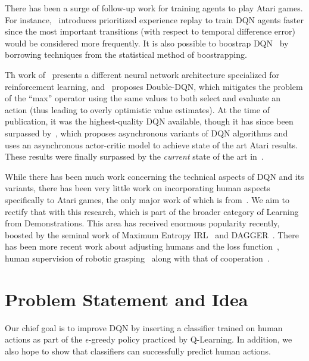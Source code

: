 \documentclass[letterpaper, 10pt, conference]{ieeeconf}
\begin{document}
There has been a surge of follow-up work for training agents to play Atari
games. For instance,~\cite{Schaul2016} introduces prioritized experience replay
to train DQN agents faster since the most important transitions (with respect to
temporal difference error) would be considered more frequently. It is also
possible to boostrap DQN~\cite{NIPS2016_6501} by borrowing techniques from the
statistical method of boostrapping.

Th work of~\cite{DBLP:conf/icml/WangSHHLF16} presents a different neural network
architecture specialized for reinforcement learning,
and~\cite{DBLP:conf/aaai/HasseltGS16} proposes Double-DQN, which mitigates
the problem of the ``max'' operator using the same values to both select and
evaluate an action (thus leading to overly optimistic value estimates). At the
time of publication, it was the highest-quality DQN available, though it has
since been surpassed by~\cite{DBLP:conf/icml/MnihBMGLHSK16}, which proposes
asynchronous variants of DQN algorithms and uses an asynchronous actor-critic
model to achieve state of the art Atari results. These results were finally
surpassed by the \emph{current} state of the art
in~\cite{DBLP:journals/corr/JaderbergMCSLSK16}.

While there has been much work concerning the technical aspects of DQN and its
variants, there has been very little work on incorporating human aspects
specifically to Atari games, the only major work of which is
from~\cite{DBLP:journals/corr/HosuR16}. We aim to rectify that with this
research, which is part of the broader category of Learning from Demonstrations.
This area has received enormous popularity recently, boosted by the seminal work
of Maximum Entropy IRL~\cite{Ziebart_2008_6055} and
DAGGER~\cite{DBLP:journals/jmlr/RossGB11}.  There has been more recent work
about adjusting humans and the loss function~\cite{conf/nips/KimFPP13}, human
supervision of robotic
grasping~\cite{DBLP:journals/corr/LaskeyCLMKJDG16,DBLP:dblp_conf/icra/LaskeySHMPDG16}
along with that of cooperation~\cite{NIPS2016_6420}.



\section{Problem Statement and Idea}\label{sec:idea}

Our chief goal is to improve DQN by inserting a classifier trained on human
actions as part of the $\epsilon$-greedy policy practiced by Q-Learning. In
addition, we also hope to show that classifiers can successfully predict human
actions.
\end{document}
